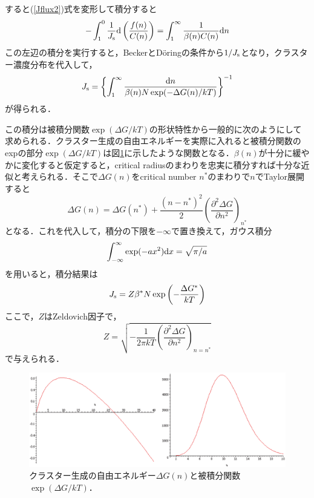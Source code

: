 \documentclass[a4j,10pt]{jarticle}
\begin{document}
すると(\ref{Jflux2})式を変形して積分すると
\begin{equation}
- \int^{0}_{1}{\frac{1}{J_{\rm s}} {\rm d} \left(\frac{f(n)}{C(n)} \right)} =
\int^{\infty}_{1}{\frac{1}{\beta(n)C(n)}{\rm d}n}
\end{equation}
この左辺の積分を実行すると，BeckerとD\"{o}ringの条件から$1/J_{\rm s}$となり，クラスター濃度分布を代入して，
\begin{equation}
J_{\rm s} = \left\{ \int^{\infty}_{1}{\frac{{\rm d}n}{\beta(n)N \exp (-\Delta G(n)/kT)} }
\right\}^{-1}
\end{equation}
が得られる．

この積分は被積分関数$\exp(\Delta G/kT)$の形状特性から一般的に次のようにして求められる．クラスター生成の自由エネルギーを実際に入れると被積分関数のexpの部分$\exp(\Delta G/kT)$は図\ref{dG}に示したような関数となる．$\beta(n)$が十分に緩やかに変化すると仮定すると，critical radiusのまわりを忠実に積分すれば十分な近似と考えられる．そこで$\Delta G(n)$をcritical number $n^*$のまわりで$n$でTaylor展開すると
\begin{equation}
\Delta G(n) = \Delta G(n^*) + \frac{(n-n^*)^2}{2}
\left(\frac{\partial^2 \Delta G}{\partial n^2} \right)_{n^*}
\end{equation}
となる．これを代入して，積分の下限を$-\infty$で置き換えて，ガウス積分
\begin{equation}
\int_{-\infty}^{\infty} \exp(-a x^2) {\rm d} x = \sqrt{\pi/a}
\end{equation}
を用いると，積分結果は
\begin{equation}
J_{\rm s} = Z \beta^* N \exp\left( - \frac{\Delta G^*}{kT} \right)
\end{equation}
ここで，$Z$はZeldovich因子で，
\begin{equation}
Z = \sqrt{-\frac{1}{2\pi kT} 
\left(\frac{\partial^2 \Delta G}{\partial n^2}\right)_{n=n^*}}
\end{equation}
で与えられる．
\begin{figure}\begin{center}
\includegraphics[width=125mm]{./figs/dG.eps}
\caption{クラスター生成の自由エネルギー$\Delta G(n)$と被積分関数$\exp(\Delta G/kT)$．}
\label{dG}
\end{center}\end{figure}
\end{document}
